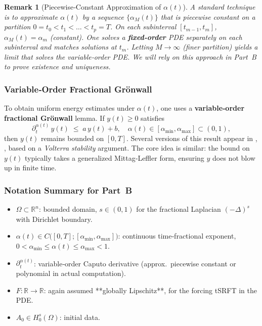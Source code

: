 \documentclass[12pt]{article}
\newtheorem{remark}[theorem]{Remark}
\begin{document}
\begin{remark}[Piecewise‐Constant Approximation of \(\alpha(t)\)]
\label{rem:alpha_piecewise}
A standard technique is to approximate \(\alpha(t)\) by a sequence 
$\{\alpha_M(t)\}$ that is \emph{piecewise constant} on a partition 
$0=t_0<t_1<\dots<t_{p}=T$. On each subinterval $[t_{m-1},t_m]$, 
$\alpha_M(t)=\alpha_m$ (constant). One solves a \textbf{fixed‐order} PDE 
separately on each subinterval and matches solutions at $t_m$. 
Letting $M\to \infty$ (finer partition) yields a limit that solves the 
variable‐order PDE.  We will rely on this approach in Part~B to prove 
existence and uniqueness.
\end{remark}

\subsubsection{Variable‐Order Fractional Gr\"onwall}

To obtain uniform energy estimates under \(\alpha(t)\), one uses a 
\textbf{variable‐order fractional Gr\"onwall} lemma.  If $y(t)\ge0$ satisfies
\[
\partial_t^{\alpha(t)}\,y(t) \;\le\; a\,y(t) + b,
\quad
\alpha(t)\in[\alpha_{\min},\alpha_{\max}]\subset(0,1),
\]
then $y(t)$ remains bounded on $[0,T]$.  Several versions of this result 
appear in \cite{Sun2019}, \cite{Ye2007}, based on a \emph{Volterra stability} 
argument.  The core idea is similar:  the bound on $y(t)$ typically takes 
a generalized Mittag‐Leffler form, ensuring $y$ does not blow up in finite time.

\subsubsection{Notation Summary for Part~B}

\begin{itemize}
\item $\Omega\subset \mathbb{R}^n$: bounded domain, $s\in(0,1)$ for the fractional 
      Laplacian $(-\Delta)^s$ with Dirichlet boundary. 
\item $\alpha(t)\in C\bigl([0,T];[\alpha_{\min},\alpha_{\max}]\bigr)$: continuous time‐fractional 
      exponent, $0<\alpha_{\min}\le \alpha(t)\le \alpha_{\max}<1$. 
\item $\partial_t^{\alpha(t)}$: variable‐order Caputo derivative (approx.\ piecewise 
      constant or polynomial in actual computation).
\item $F:\mathbb{R}\to\mathbb{R}$: again assumed **globally Lipschitz**, for the forcing 
      tSRFT in the PDE. 
\item $A_0\in H_0^s(\Omega)$: initial data. 
\end{itemize}
\end{document}
